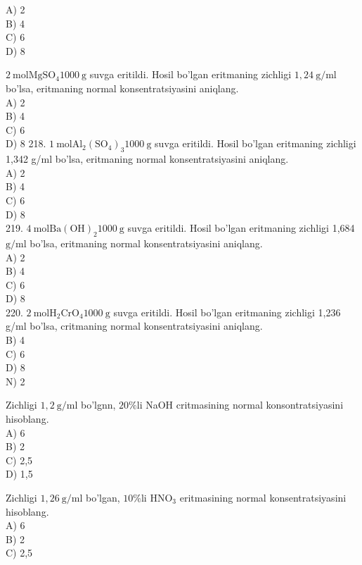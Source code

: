 A) 2\\
B) 4\\
C) 6\\
D) 8
  \item $2 \mathrm{~mol} \mathrm{MgSO}{ }_{4} 1000 \mathrm{~g}$ suvga eritildi. Hosil bo'lgan eritmaning zichligi $1,24 \mathrm{~g} / \mathrm{ml}$ bo'lsa, eritmaning normal konsentratsiyasini aniqlang.\\
A) 2\\
B) 4\\
C) 6\\
D) 8
218. $1 \mathrm{~mol} \mathrm{Al}_{2}\left(\mathrm{SO}_{4}\right)_{3} 1000 \mathrm{~g}$ suvga eritildi. Hosil bo'lgan eritmaning zichligi 1,342 g/ml bo'lsa, eritmaning normal konsentratsiyasini aniqlang.\\
A) 2\\
B) 4\\
C) 6\\
D) 8\\
219. $4 \mathrm{~mol} \mathrm{Ba}(\mathrm{OH})_{2} 1000 \mathrm{~g}$ suvga eritildi. Hosil bo'lgan eritmaning zichligi 1,684 $\mathrm{g} / \mathrm{ml}$ bo'lsa, eritmaning normal konsentratsiyasini aniqlang.\\
A) 2\\
B) 4\\
C) 6\\
D) 8\\
220. $2 \mathrm{~mol} \mathrm{H}_{2} \mathrm{CrO}_{4} 1000 \mathrm{~g}$ suvga eritildi.
Hosil bo'lgan eritmaning zichligi 1,236\\
g/ml bo'lsa, critmaning normal konsentratsiyasini aniqlang.\\
B) 4\\
C) 6\\
D) 8\\
N) 2
  \item Zichligi $1,2 \mathrm{~g} / \mathrm{ml}$ bo'lgnn, $20 \% \mathrm{li}$ NaOH critmasining normal konsontratsiyasini hisoblang.\\
A) 6\\
B) 2\\
C) 2,5\\
D) 1,5
  \item Zichligi $1,26 \mathrm{~g} / \mathrm{ml}$ bo'lgan, $10 \% \mathrm{li}$ $\mathrm{HNO}_{3}$ eritmasining normal konsentratsiyasini hisoblang.\\
A) 6\\
B) 2\\
C) 2,5\\
